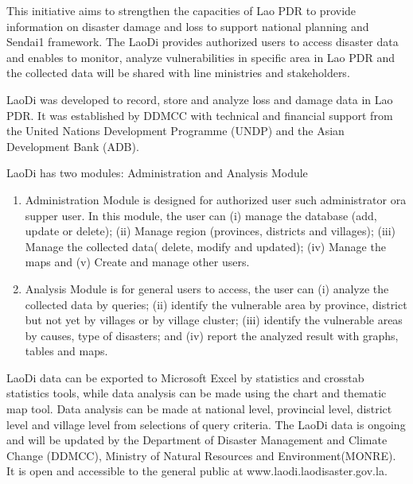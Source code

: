 \vspace{0.4 cm}

This initiative aims to strengthen the capacities of Lao PDR to provide information on disaster damage and loss to support national planning and Sendai1 framework. The LaoDi provides authorized users to access disaster data and enables to monitor, analyze vulnerabilities in specific area in Lao PDR and the collected data will be shared with line ministries and stakeholders.

\vspace{0.4 cm}

LaoDi was developed to record, store and analyze loss and damage data in Lao PDR. It was established by DDMCC with technical and financial support from the United Nations Development Programme (UNDP) and the Asian Development Bank (ADB). 

\vspace{0.4 cm}

LaoDi has two modules:  Administration and Analysis Module

\begin{enumerate}
\item Administration Module is designed for authorized user such administrator ora supper user. In this module, the user can (i) manage the database (add, update or delete); (ii) Manage region (provinces, districts and villages); (iii) Manage the  collected data(  delete, modify and updated); (iv) Manage  the maps and (v) Create and manage other users.
\item Analysis Module is for general users to access, the user can (i) analyze the collected data by queries; (ii) identify the  vulnerable area by  province, district  but not yet by villages or by village cluster; (iii) identify the  vulnerable areas by  causes,  type of disasters; and (iv) report  the analyzed result with graphs, tables and maps.
\end{enumerate}

LaoDi data can be exported to Microsoft Excel by statistics and crosstab statistics tools, while data analysis can be made using the chart and thematic map tool. Data analysis can be made at national level, provincial level, district level and village level from selections of query criteria. The LaoDi data is ongoing and will be updated by the Department of Disaster Management and Climate Change (DDMCC), Ministry of Natural Resources and Environment(MONRE). It is open and accessible to the general public at www.laodi.laodisaster.gov.la.

